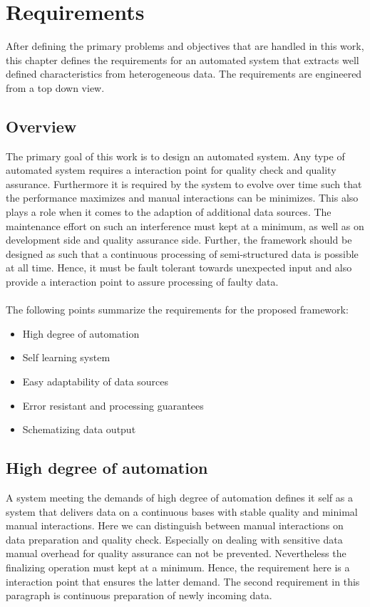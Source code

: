 \chapter{Requirements\label{cha:chapter3}}

After defining the primary problems and objectives that are handled in this work, this chapter defines the requirements for an automated system that extracts well defined characteristics from heterogeneous data. The requirements are engineered from a top down view.

\section{Overview\label{sec:reqoverview}}

The primary goal of this work is to design an automated system. Any type of automated system requires a interaction point for quality check and quality assurance. Furthermore it is required by the system to evolve over time such that the performance maximizes and manual interactions can be minimizes. This also plays a role when it comes to the adaption of additional data sources. The maintenance effort on such an interference must kept at a minimum, as well as on development side and quality assurance side. Further, the framework should be designed as such that a continuous processing of semi-structured data is possible at all time. Hence, it must be fault tolerant towards unexpected input and also provide a interaction point to assure processing of faulty data.
\\\\
The following points summarize the requirements for the proposed framework:
\begin{itemize}
\item High degree of automation
\item Self learning system
\item Easy adaptability of data sources
\item Error resistant and processing guarantees
\item Schematizing data output 
\end{itemize}

\section{High degree of automation}

A system meeting the demands of high degree of automation defines it self as a system that delivers data on a continuous bases with stable quality and minimal manual interactions. Here we can distinguish between manual interactions on data preparation and quality check. Especially on dealing with sensitive data manual overhead for quality assurance can not be prevented. Nevertheless the finalizing operation must kept at a minimum. Hence, the requirement here is a interaction point that ensures the latter demand. The second requirement in this paragraph is continuous preparation of newly incoming data.

